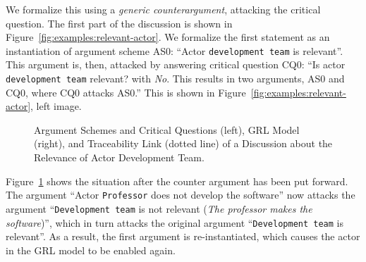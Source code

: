 We formalize this using a \emph{generic counterargument}, attacking the critical question. The first part of the discussion is shown in Figure~\ref{fig:examples:relevant-actor}. We formalize the first statement as an instantiation of argument scheme AS0: ``Actor \texttt{development team} is relevant''. This argument is, then, attacked by answering critical question CQ0: ``Is actor \texttt{development team} relevant? with \emph{No}. This results in two arguments, AS0 and CQ0, where CQ0 attacks AS0.'' This is shown in Figure~\ref{fig:examples:relevant-actor}, left image.

\begin{figure}[ht!]
\centering
\caption{Argument Schemes and Critical Questions (left), GRL Model (right), and Traceability Link (dotted line) of a Discussion about the Relevance of Actor Development Team.}
\label{fig:examples:relevant-actor2}
\end{figure}

Figure~\ref{fig:examples:relevant-actor2} shows the situation after the counter argument has been put forward. The argument ``Actor \texttt{Professor} does not develop the software'' now attacks the argument ``\texttt{Development team} is not relevant (\emph{The professor makes the software})'', which in turn attacks the original argument ``\texttt{Development team} is relevant''. As a result, the first argument is re-instantiated, which causes the actor in the GRL model to be enabled again.
